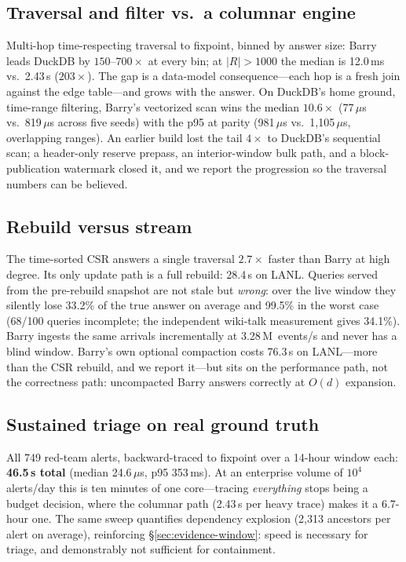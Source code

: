 \documentclass[11pt,letterpaper,twocolumn]{article}
\begin{document}
\subsection{Traversal and filter vs.\ a columnar engine}
\label{sec:eval-traversal}
Multi-hop time-respecting traversal to fixpoint, binned by answer
size: Barry leads DuckDB by $150$--$700\times$ at every bin;
at $|R|>1000$ the median is 12.0\,ms vs.\ 2.43\,s ($203\times$). The
gap is a data-model consequence---each hop is a fresh join against
the edge table---and grows with the answer. On DuckDB's home
ground, time-range filtering, Barry's vectorized scan wins the median
$10.6\times$ (77\,$\mu$s vs.\ 819\,$\mu$s across five seeds) with
the p95 at parity (981\,$\mu$s vs.\ 1{,}105\,$\mu$s, overlapping
ranges). An earlier build lost the tail $4\times$ to DuckDB's
sequential scan; a header-only reserve prepass, an interior-window
bulk path, and a block-publication watermark closed it, and we report
the progression so the traversal numbers can be believed.

\subsection{Rebuild versus stream}
\label{sec:eval-staleness}
The time-sorted CSR answers a single traversal $2.7\times$ faster
than Barry at high degree. Its only update path is a full rebuild:
28.4\,s on LANL. Queries served from the pre-rebuild snapshot are not
stale but \emph{wrong}: over the live window they silently lose
33.2\% of the true answer on average and 99.5\% in the worst case
(68/100 queries incomplete; the independent wiki-talk measurement
gives 34.1\%). Barry ingests the same arrivals incrementally at
3.28\,M~events/s and never has a blind window. Barry's own optional
compaction costs 76.3\,s on LANL---more than the CSR rebuild, and we
report it---but sits on the performance path, not the correctness
path: uncompacted Barry answers correctly at $O(d)$ expansion.

\subsection{Sustained triage on real ground truth}
All 749 red-team alerts, backward-traced to fixpoint over a 14-hour
window each: \textbf{46.5\,s total} (median 24.6\,$\mu$s, p95
353\,ms). At an enterprise volume of $10^4$ alerts/day this is ten
minutes of one core---tracing \emph{everything} stops being a budget
decision, where the columnar path (2.43\,s per heavy trace) makes it
a 6.7-hour one. The same sweep quantifies dependency explosion (2,313
ancestors per alert on average), reinforcing
\S\ref{sec:evidence-window}: speed is necessary for triage, and
demonstrably not sufficient for containment.
\end{document}
